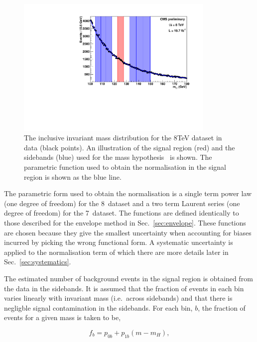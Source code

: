 \begin{figure}
  \begin{center}
    \includegraphics[width=0.85\textwidth]{analysis/plots/sideband/invmass.pdf}
    \caption{The inclusive invariant mass distribution for the 8TeV dataset in data (black points). An illustration of the signal region (red) and the sidebands (blue) used for the mass hypothesis ~\GeV is shown. The parametric function used to obtain the normalisation in the signal region is shown as the blue line.}
    \label{fig:sideband_norm}
  \end{center}
\end{figure}

The parametric form used to obtain the normalisation is a single term power law (one degree of freedom) for the 8~\TeV dataset and a two term Laurent series (one degree of freedom) for the 7~\TeV dataset. The functions are defined identically to those described for the envelope method in Sec.~\ref{sec:envelope}. These functions are chosen because they give the smallest uncertainty when accounting for biases incurred by picking the wrong functional form. A systematic uncertainty is applied to the normalisation term of which there are more details later in Sec.~\ref{sec:systematics}.

The estimated number of background events in the signal region is obtained from the data in the sidebands. It is assumed that the fraction of events in each bin varies linearly with invariant mass (i.e.~across sidebands) and that there is negligble signal contamination in the sidebands. For each bin, $b$, the fraction of events for a given mass is taken to be,

\begin{equation}
  f_{b} = p_{0b} + p_{1b}(m-m_{H}),
\end{equation}

